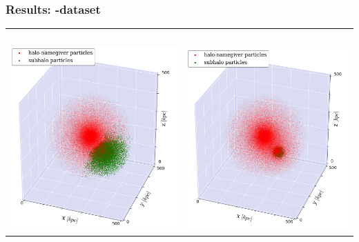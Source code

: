 \begin{frame}
	\frametitle{Results: \dt-dataset}
	
	\begin{tabular}{c c}
		\simple\ 	& \neigh \\[1.5em]
		{\includegraphics[width = .49\textwidth]{../report/images/dice-two/dice-two-plot-halo1451-nosaddle.png}} &
		{\includegraphics[width = .49\textwidth]{../report/images/dice-two/dice-two-plot-halo1451-saddle.png}} \hspace*{-1em} 
	\end{tabular}
\end{frame}





